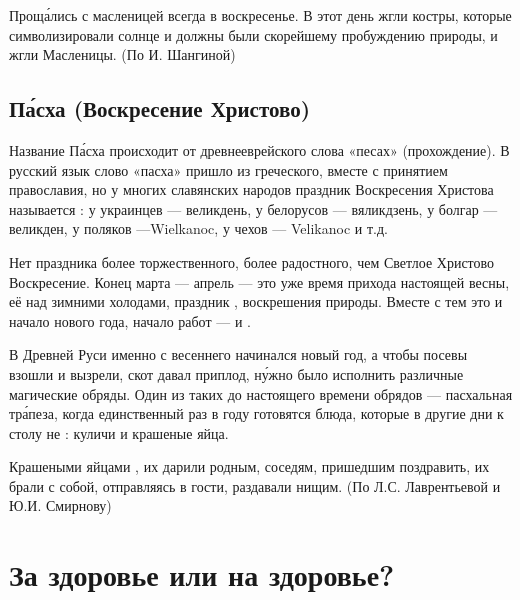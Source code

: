 Прощ\'{а}лись с масленицей всегда в воскресенье.
В этот день жгли костры, которые символизировали солнце и должны были  скорейшему пробуждению природы, и жгли  Масленицы. (По И. Шангиной)



\subsection{П\'{а}сха (Воскресение Христово)}
Название П\'{а}сха происходит от древнееврейского слова «песах» (прохождение). В русский язык слово «пасха» пришло из греческого, вместе с принятием православия, но у многих славянских народов праздник Воскресения Христова называется : у украинцев --- великдень, у белорусов --- вяликдзень, у болгар --- великден, у поляков ---Wielkanoc, у чехов --- Velikanoc и т.д.

Нет праздника более торжественного, более радостного, чем Светлое
Христово Воскресение. Конец марта --- апрель --- это уже время прихода
настоящей весны, её 
над зимними холодами, праздник ,
воскрешения природы. Вместе с тем это и начало нового
года, начало  работ
---  и .

В Древней Руси именно с весеннего 
начинался новый год, а чтобы посевы  взошли и вызрели,
скот давал приплод, н\'{у}жно было исполнить различные магические обряды.
Один из таких  до настоящего времени обрядов
--- пасхальная тр\'{а}пеза, когда единственный раз в году готовятся блюда,
которые в другие дни к столу не :
куличи и крашеные яйца.

Крашеными яйцами ,
их дарили родным, соседям, пришедшим поздравить, их брали с собой, отправляясь
в гости, раздавали нищим. (По Л.С. Лаврентьевой и Ю.И. Смирнову)

\newpage
\section{За здоровье или на здоровье?}

